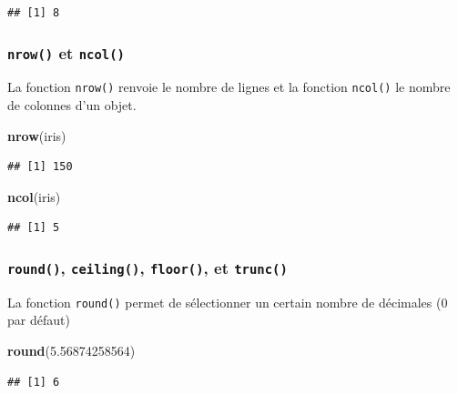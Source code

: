 \documentclass[twoside,symmetric]{book}
\newenvironment{Shaded}{}{}
\newcommand{\FloatTok}[1]{#1}
\newcommand{\KeywordTok}[1]{\textbf{#1}}
\newcommand{\NormalTok}[1]{#1}
\begin{document}
\begin{verbatim}
## [1] 8
\end{verbatim}

\hypertarget{l015nrow}{%
\subsubsection{\texorpdfstring{\texttt{nrow()} et \texttt{ncol()}}{nrow() et ncol()}}\label{l015nrow}}

La fonction \texttt{nrow()} renvoie le nombre de lignes et la fonction \texttt{ncol()} le nombre de colonnes d'un objet.

\begin{Shaded}
\begin{Highlighting}[]
\KeywordTok{nrow}\NormalTok{(iris)}
\end{Highlighting}
\end{Shaded}

\begin{verbatim}
## [1] 150
\end{verbatim}

\begin{Shaded}
\begin{Highlighting}[]
\KeywordTok{ncol}\NormalTok{(iris)}
\end{Highlighting}
\end{Shaded}

\begin{verbatim}
## [1] 5
\end{verbatim}

\hypertarget{l015round}{%
\subsubsection{\texorpdfstring{\texttt{round()}, \texttt{ceiling()}, \texttt{floor()}, et \texttt{trunc()}}{round(), ceiling(), floor(), et trunc()}}\label{l015round}}

La fonction \texttt{round()} permet de sélectionner un certain nombre de décimales (0 par défaut)

\begin{Shaded}
\begin{Highlighting}[]
\KeywordTok{round}\NormalTok{(}\FloatTok{5.56874258564}\NormalTok{)}
\end{Highlighting}
\end{Shaded}

\begin{verbatim}
## [1] 6
\end{verbatim}
\end{document}
